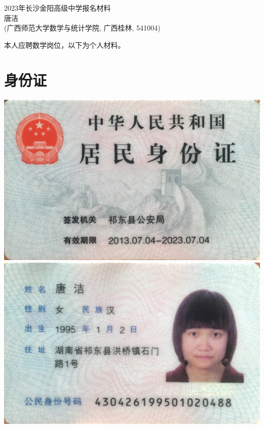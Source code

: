 \documentclass[UFT8]{ctexart}%
\begin{document}
\thispagestyle{empty} %
\vspace*{3cm}
\begin{center}
{{\LARGE\heiti 2023年长沙金阳高级中学报名材料}\\[0.6cm]
{\normalsize 唐洁}\\[0.1cm]
{\small(广西师范大学数学与统计学院, 广西桂林, 541004)}}
\end{center}

\clearpage%
\tableofcontents%
\thispagestyle{empty} %

\clearpage%
\setcounter{page}{1}%
本人应聘数学岗位，以下为个人材料。


\section{身份证}
\begin{center}
  \includegraphics[scale=0.2]{figs/身份证1.JPG }
  \includegraphics[scale=0.2]{figs/身份证2.JPG }
\end{center}
\end{document}
